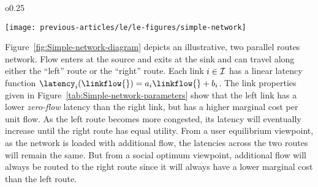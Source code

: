 \begin{wrapfigure}{o}{0.25\columnwidth}%
\begin{centering}
\texttt{[image: previous-articles/le/le-figures/simple-network]}
\par\end{centering}

\protect\caption[Network diagram for 2-link communication network routing example.]{Network diagram\label{fig:Simple-network-diagram}}
\end{wrapfigure}%
Figure~\ref{fig:Simple-network-diagram} depicts an illustrative,
two parallel routes network. Flow enters at the source and exits at
the sink and can travel along either the ``left'' route or the ``right''
route. Each link $i\in\mathcal{I}$ has a linear latency function $\latency_{\link}\left(\linkflow{}\right)=a_{\link}\linkflow{}+b_{\link}$.
The link properties given in Figure~\ref{tab:Simple-network-parameters}
show that the left link has a lower \emph{zero-flow} latency than
the right link, but has a higher marginal cost per unit flow. As the
left route becomes more congested, its latency will eventually increase
until the right route has equal utility. From a user equilibrium viewpoint,
as the network is loaded with additional flow, the latencies across
the two routes will remain the same. But from a social optimum viewpoint,
additional flow will always be routed to the right route since it
will always have a lower marginal cost than the left route.
\begin{table}
\centering
{}\hfill%
\caption{Summary of illustrative network properties. \textbf{\ref{tab:Simple-network-parameters}}: Link-level input parameters. \textbf{\ref{tab:Demands}:} Network-level input demands}
\end{table}


